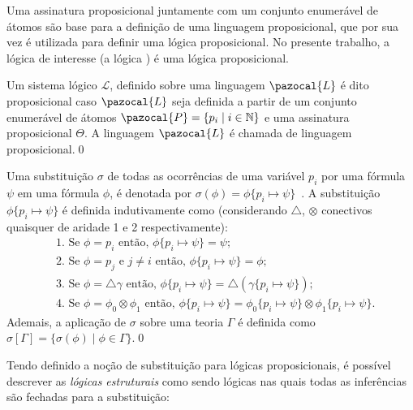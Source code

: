 Uma assinatura proposicional juntamente com um conjunto enumerável de átomos são base para a definição de uma linguagem proposicional, que por sua vez é utilizada para definir uma lógica proposicional. No presente trabalho, a lógica de interesse (a lógica \lfium{}) é uma lógica proposicional.

\begin{definicao}
    \label{def:proposicional}
    Um sistema lógico $\mathcal{L}$, definido sobre uma linguagem $\pazocal{L}$ é dito proposicional caso $\pazocal{L}$ seja definida a partir de um conjunto enumerável de átomos $\pazocal{P} = \{p_{i} \;| \; i \in \mathbb{N} \}$ e uma assinatura proposicional $\Theta$. A linguagem $\pazocal{L}$ é chamada de linguagem proposicional.\qed{}
\end{definicao}

\begin{definicao}[Substituição]
    Uma substituição $\sigma$ de todas as ocorrências de uma variável $p_{i}$ por uma fórmula $\psi$ em uma fórmula $\phi$, é denotada por $\sigma(\phi) = \phi\{p_{i} \mapsto \psi\}$~\cite{dedo}. A substituição $\phi\{p_{i} \mapsto \psi\}$ é definida indutivamente como (considerando $\triangle$, $\otimes$ conectivos quaisquer de aridade 1 e 2 respectivamente):
    \begin{align*}
         & \text{1.~Se }\phi = p_{i} \text{ então, } \phi\{p_{i} \mapsto \psi\} = \psi;                                                                                             \\
         & \text{2.~Se }\phi = p_{j} \text{ e } j \neq i \text{ então, }\phi\{p_{i} \mapsto \psi\} = \phi;                                                                          \\
         & \text{3.~Se }\phi = \triangle \gamma \text{ então, } \phi\{p_{i} \mapsto \psi\} = \triangle(\gamma\{p_{i} \mapsto \psi\});                                                 \\
         & \text{4.~Se }\phi = \phi_{0} \otimes \phi_{1} \text{ então, } \phi\{p_{i} \mapsto \psi\} = \phi_{0}\{p_{i} \mapsto \psi\} \otimes \phi_{1}\{p_{i} \mapsto \psi\}.
    \end{align*}
    Ademais, a aplicação de $\sigma$ sobre uma teoria $\Gamma$ é definida como $\sigma[\Gamma] = \{\sigma(\phi) \; | \; \phi \in \Gamma\}$.\qed{}
\end{definicao}


Tendo definido a noção de substituição para lógicas proposicionais, é possível descrever as \textit{lógicas estruturais} como sendo lógicas nas quais todas as inferências são fechadas para a substituição:

